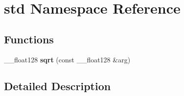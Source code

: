 \hypertarget{namespacestd}{}\section{std Namespace Reference}
\label{namespacestd}
\subsection*{Functions}
\begin{DoxyCompactItemize}
\item 
\mbox{\label{namespacestd_ab95da5bb6ce2727fcb1b9c323a669133}} 
\+\_\+\+\_\+float128 {\bfseries sqrt} (const \+\_\+\+\_\+float128 \&arg)
\end{DoxyCompactItemize}


\subsection{Detailed Description}
